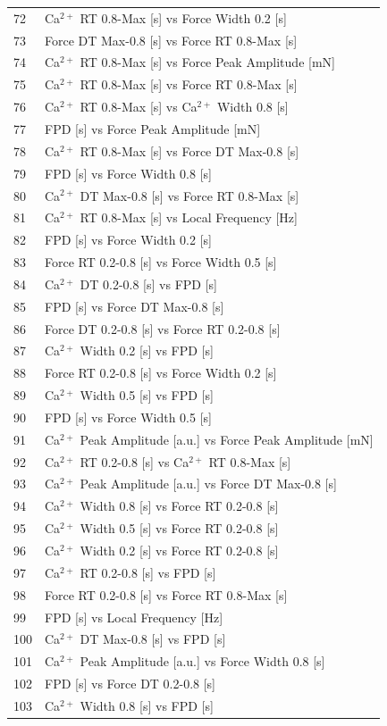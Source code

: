 \documentclass{report}
\begin{document}
\begin{tabular}{@{}ll@{}}
72 & Ca$^{2+}$ RT 0.8-Max [s] vs Force Width 0.2 [s] \\
73 & Force DT Max-0.8 [s] vs Force RT 0.8-Max [s] \\
74 & Ca$^{2+}$ RT 0.8-Max [s] vs Force Peak Amplitude [mN] \\
75 & Ca$^{2+}$ RT 0.8-Max [s] vs Force RT 0.8-Max [s] \\
76 & Ca$^{2+}$ RT 0.8-Max [s] vs Ca$^{2+}$ Width 0.8 [s] \\
77 & FPD [s] vs Force Peak Amplitude [mN] \\
78 & Ca$^{2+}$ RT 0.8-Max [s] vs Force DT Max-0.8 [s] \\
79 & FPD [s] vs Force Width 0.8 [s] \\
80 & Ca$^{2+}$ DT Max-0.8 [s] vs Force RT 0.8-Max [s] \\
81 & Ca$^{2+}$ RT 0.8-Max [s] vs Local Frequency [Hz] \\
82 & FPD [s] vs Force Width 0.2 [s] \\
83 & Force RT 0.2-0.8 [s] vs Force Width 0.5 [s] \\
84 & Ca$^{2+}$ DT 0.2-0.8 [s] vs FPD [s] \\
85 & FPD [s] vs Force DT Max-0.8 [s] \\
86 & Force DT 0.2-0.8 [s] vs Force RT 0.2-0.8 [s] \\
87 & Ca$^{2+}$ Width 0.2 [s] vs FPD [s] \\
88 & Force RT 0.2-0.8 [s] vs Force Width 0.2 [s] \\
89 & Ca$^{2+}$ Width 0.5 [s] vs FPD [s] \\
90 & FPD [s] vs Force Width 0.5 [s] \\
91 & Ca$^{2+}$ Peak Amplitude [a.u.] vs Force Peak Amplitude [mN] \\
92 & Ca$^{2+}$ RT 0.2-0.8 [s] vs Ca$^{2+}$ RT 0.8-Max [s] \\
93 & Ca$^{2+}$ Peak Amplitude [a.u.] vs Force DT Max-0.8 [s] \\
94 & Ca$^{2+}$ Width 0.8 [s] vs Force RT 0.2-0.8 [s] \\
95 & Ca$^{2+}$ Width 0.5 [s] vs Force RT 0.2-0.8 [s] \\
96 & Ca$^{2+}$ Width 0.2 [s] vs Force RT 0.2-0.8 [s] \\
97 & Ca$^{2+}$ RT 0.2-0.8 [s] vs FPD [s] \\
98 & Force RT 0.2-0.8 [s] vs Force RT 0.8-Max [s] \\
99 & FPD [s] vs Local Frequency [Hz] \\
100 & Ca$^{2+}$ DT Max-0.8 [s] vs FPD [s] \\
101 & Ca$^{2+}$ Peak Amplitude [a.u.] vs Force Width 0.8 [s] \\
102 & FPD [s] vs Force DT 0.2-0.8 [s] \\
103 & Ca$^{2+}$ Width 0.8 [s] vs FPD [s] \\
\bottomrule
\end{tabular}
\hspace{1em} %
\end{document}
